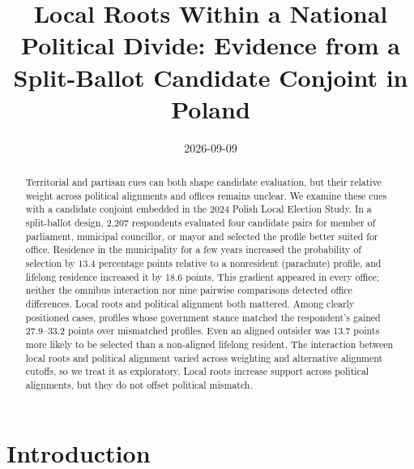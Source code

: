 \documentclass[
  letterpaper,
  DIV=11,
  numbers=noendperiod]{scrartcl}
\title{Local Roots Within a National Political Divide: Evidence from a
Split-Ballot Candidate Conjoint in Poland}
\author{}
\date{2026-09-09}
\begin{document}
\maketitle
\begin{abstract}
Territorial and partisan cues can both shape candidate evaluation, but
their relative weight across political alignments and offices remains
unclear. We examine these cues with a candidate conjoint embedded in the
2024 Polish Local Election Study. In a split-ballot design, 2,207
respondents evaluated four candidate pairs for member of parliament,
municipal councillor, or mayor and selected the profile better suited
for office. Residence in the municipality for a few years increased the
probability of selection by 13.4 percentage points relative to a
nonresident (parachute) profile, and lifelong residence increased it by
18.6 points. This gradient appeared in every office; neither the omnibus
interaction nor nine pairwise comparisons detected office differences.
Local roots and political alignment both mattered. Among clearly
positioned cases, profiles whose government stance matched the
respondent's gained 27.9--33.2 points over mismatched profiles. Even an
aligned outsider was 13.7 points more likely to be selected than a
non-aligned lifelong resident. The interaction between local roots and
political alignment varied across weighting and alternative alignment
cutoffs, so we treat it as exploratory. Local roots increase support
across political alignments, but they do not offset political mismatch.
\end{abstract}


\section{Introduction}\label{introduction}
\end{document}
